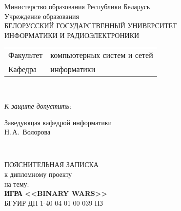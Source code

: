 
\begin{titlepage}
    \begin{center}
        Министерство образования Республики Беларусь \\[1em]
        Учреждение образования \\
        БЕЛОРУССКИЙ ГОСУДАРСТВЕННЫЙ УНИВЕРСИТЕТ \\
        ИНФОРМАТИКИ И РАДИОЭЛЕКТРОНИКИ \\[1em]

        \begin{minipage}{\textwidth}
            \begin{flushleft}
                \begin{tabular}{ll}
                    Факультет & компьютерных систем и сетей \\
                    Кафедра & информатики
                \end{tabular}
            \end{flushleft}
        \end{minipage} \\[1em]

        \begin{flushright}
            \begin{minipage}{0.4\textwidth}
                \emph{К защите допустить:} \\[0.8em]
                \raggedright Заведующая кафедрой информатики \\[0.45em]
                \underline{\hspace*{2.8cm}} Н.\,А.~Волорова
            \end{minipage} \\[2.2em]
        \end{flushright}

        ПОЯСНИТЕЛЬНАЯ ЗАПИСКА \\
        к дипломному проекту \\
        на тему: \\[1.4em]

        \textbf{\large\MakeUppercase{Игра <<Binary Wars>>}} \\[1.4em]

        БГУИР ДП 1-40 04 01 00 039 ПЗ \\[2em]


\end{center}
\end{titlepage}
